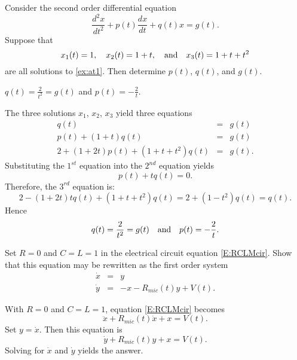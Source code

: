 \documentclass{ximera}
\begin{document}
\begin{exercise} \label{c14.3.4}
Consider the second order differential equation
\begin{equation}  \label{ex:at1}
\frac{d^2x}{dt^2} + p(t)\frac{dx}{dt} + q(t)x = g(t).
\end{equation}
Suppose that
\[
x_1(t) = 1, \quad  x_2(t) = 1+t, \quad\mbox{and}\quad x_3(t) = 1+t+t^2
\]
are all solutions to \eqref{ex:at1}.  Then determine $p(t)$, $q(t)$, and
$g(t)$.

\begin{solution}
\ans $q(t) = \frac{2}{t^2} = g(t)$ and  
$p(t) = -\frac{2}{t}$.

\soln  The three solutions $x_1$, $x_2$, $x_3$ yield three equations
\begin{eqnarray*}
q(t) & = & g(t)\\
p(t) +(1+t)q(t) & = & g(t)\\
2 + (1+2t)p(t) + (1+t+t^2)q(t) & = & g(t).
\end{eqnarray*}
Substituting the $1^{st}$ equation into the $2^{nd}$ equation yields
\[
p(t) + tq(t) = 0.
\]
Therefore, the $3^{rd}$ equation is:
\[
2 - (1+2t)tq(t) + (1+t+t^2)q(t) = 2 + (1-t^2)q(t) = q(t).
\]
Hence 
\[
q(t) = \frac{2}{t^2} = g(t) \quad\mbox{and}\quad  p(t) = -\frac{2}{t}.
\]

\end{solution}
\end{exercise}

\begin{exercise} \label{c14.3.4A}
Set $R=0$ and $C=L=1$ in the electrical circuit equation \eqref{E:RCLMcir}. 
Show that this equation may be rewritten as the first order system
\begin{equation} \label{E:ECsy}
\begin{array}{rcl}
\dot{x} & = & y \\
\dot{y} & = & -x -R_{mic}(t)y + V(t).
\end{array} 
\end{equation}

\begin{solution}

With $R=0$ and $C=L=1$, equation \eqref{E:RCLMcir} becomes
\[
\ddot{x} + R_{mic}(t)\dot{x} + x = V(t).
\]
Set $y=\dot{x}$.  Then this equation is
\[
\dot{y} + R_{mic}(t)y + x = V(t).
\]
Solving for $\dot{x}$ and $\dot{y}$ yields the answer. 

\end{solution}
\end{exercise}

\CEXER
\end{document}
